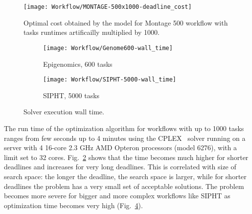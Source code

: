 {    \begin{figure}[tb]
       \centering \texttt{[image: Workflow/MONTAGE-500x1000-deadline\_cost]}
       \caption{Optimal cost obtained by the model for Montage 500 workflow with tasks runtimes artificailly 
       multiplied by 1000.
       \label{fig:montage-500x1000}}
    \end{figure}

    \begin{figure}[tb] 
       \centering
       
       \begin{subfigure}[b]{0.49\textwidth}  
         \texttt{[image: Workflow/Genome600-wall\_time]}
         \caption{Epigenomics, 600 tasks}
         \label{fig:genome-600-opttime}
       \end{subfigure}
       \begin{subfigure}[b]{0.49\textwidth}
         \texttt{[image: Workflow/SIPHT-5000-wall\_time]}
         \caption{SIPHT, 5000 tasks}
         \label{fig:sipht-5000-opttime}
       \end{subfigure}
       
       \caption{Solver execution wall time.}
    \end{figure}
  
    
    The run time of the optimization algorithm for workflows with up to 1000
    tasks ranges from few seconds up to 4 minutes using the CPLEX~\cite{cplex}
    solver running on a server with 4 16-core 2.3 GHz AMD Opteron processors
    (model 6276), with a limit set to 32 cores.
    Fig.~\ref{fig:genome-600-opttime} shows that the time becomes much higher
    for shorter deadlines and increases for very long deadlines. This is
    correlated with size of search space: the longer the deadline, the search
    space is larger, while for shorter deadlines the problem has a very small
    set of acceptable solutions.  The problem becomes more severe for bigger and
    more complex workflows like SIPHT as optimization time becomes very high
    (Fig.~\ref{fig:sipht-5000-opttime}).
    
} %